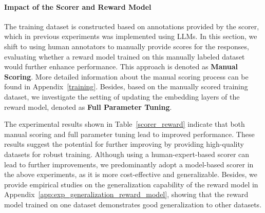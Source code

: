 \begin{table}[!t]
\centering
\caption{Experimental results of ablation study.}
\vspace{-0.1in}
\label{ablation}
\end{table}


\paragraph{Impact of the Scorer and Reward Model}

The training dataset is constructed based on annotations provided by the scorer, which in previous experiments was implemented using LLMs. In this section, we shift to using human annotators to manually provide scores for the responses, evaluating whether a reward model trained on this manually labeled dataset would further enhance performance. This approach is denoted as {\bf Manual Scoring}. More detailed information about the manual scoring process can be found in Appendix~\ref{training}.
Besides, based on the manually scored training dataset, we investigate the setting of updating the embedding layers of the reward model, denoted as {\bf Full Parameter Tuning}.

The experimental results shown in Table~\ref{scorer_reward} indicate that both manual scoring and full parameter tuning lead to improved performance. These results suggest the potential for further improving \name by providing high-quality datasets for robust training.
Although using a human-expert-based scorer can lead to further improvements, we predominantly adopt a model-based scorer in the above experiments, as it is more cost-effective and generalizable.
Besides, we provide empirical studies on the generalization capability of the reward model in Appendix~\ref{app:exp_generalization_reward_model}, showing that the reward model trained on one dataset demonstrates good generalization to other datasets.



